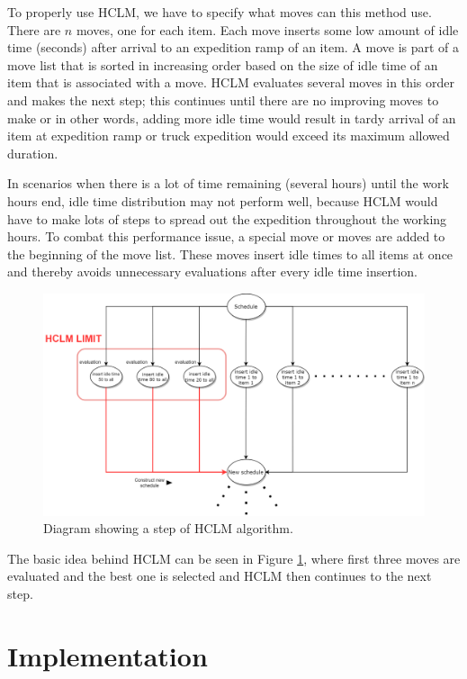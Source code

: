 \documentclass{ctuthesis}
\begin{document}
To properly use HCLM, we have to specify what moves can this method use. 
There are $n$ moves, one for each item. Each move inserts some low amount of idle time (seconds) after arrival to an expedition ramp of an item. A move is part of a move list that is sorted in increasing order based on the size of idle time of an item that is associated with a move. HCLM evaluates several moves in this order and makes the next step; this continues until there are no improving moves to make or in other words, adding more idle time would result in tardy arrival of an item at expedition ramp or truck expedition would exceed its maximum allowed duration.

 
In scenarios when there is a lot of time remaining (several hours) until the work hours end, idle time distribution may not perform well, because HCLM would have to make lots of steps to spread out the expedition throughout the working hours. To combat this performance issue, a special move or moves are added to the beginning of the move list. These moves insert idle times to all items at once and thereby avoids unnecessary evaluations after every idle time insertion.

 \begin{figure}[h]
\includegraphics[width=1\linewidth]{HCLM.png}
\caption{Diagram showing a step of HCLM algorithm.}
\label{fig:hclm}
\end{figure}

 The basic idea behind HCLM can be seen in Figure \ref{fig:hclm}, where first three moves are evaluated and the best one is selected and HCLM then continues to the next step. 
 
\chapter{Implementation}
\end{document}
